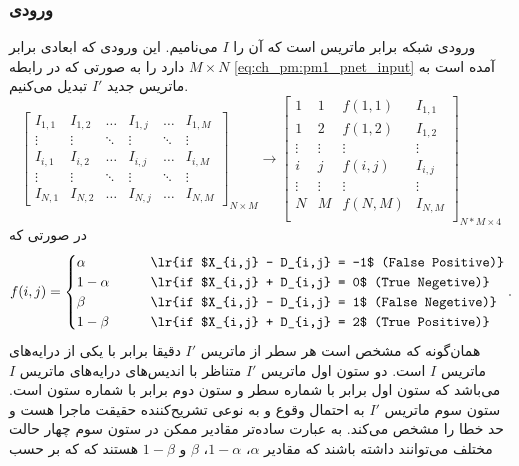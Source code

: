 \subsubsection{ورودی}
ورودی شبکه برابر ماتریس  است که آن را $I$ می‌نامیم. این ورودی که ابعادی برابر $M\times N$ دارد را به صورتی که در رابطه \ref{eq:ch_pm:pm1_pnet_input} آمده است به ماتریس جدید $I'$ تبدیل می‌کنیم. 
\begin{equation*}
	\begin{bmatrix}
		I_{1,1}  & I_{1,2} & \ldots   & I_{1,j}   & \ldots & I_{1,M}\\
		\vdots & \vdots & \ddots & \vdots & \ddots & \vdots \\
		I_{i,1}  & I_{i,2} & \ldots   & I_{i,j}   & \ldots & I_{i,M}\\
		\vdots & \vdots & \ddots & \vdots & \ddots & \vdots \\
		I_{N,1}  & I_{N,2} & \ldots   & I_{N,j}   & \ldots & I_{N,M}
	\end{bmatrix}_{N\times M}
	\rightarrow 
	 \begin{bmatrix}
	 	1          & 1         & f(1,1) & I_{1,1} \\
	 	1          & 2         & f(1,2) & I_{1,2} \\
	 	\vdots & \vdots & \vdots   & \vdots \\
	 	i          & j           & f(i,j)  & I_{i,j} \\
	 	\vdots & \vdots & \vdots   & \vdots \\
	 	N          & M         & f(N,M) & I_{N,M}\\
	 \end{bmatrix}_{N*M\times 4}
 	\label{eq:ch_pm:pm1_pnet_input}
\end{equation*}
در صورتی که
\begin{equation}
	f(i,j) = 
	\begin{cases}
		\alpha 	   \qquad & \text{\lr{if $X_{i,j} - D_{i,j} = -1$ (False Positive)}} \\
		1-\alpha  \qquad & \text{\lr{if $X_{i,j} + D_{i,j} = 0$ (True Negetive)}} \\
		\beta 		\qquad & \text{\lr{if $X_{i,j} - D_{i,j} =  1$ (False Negetive)}} \\
		1-\beta    \qquad & \text{\lr{if $X_{i,j} + D_{i,j} = 2$ (True Positive)}} 
	\end{cases}.
\end{equation}
همان‌گونه که مشخص است هر سطر از ماتریس $I'$ دقیقا برابر با یکی از درایه‌های ماتریس $I$ است. دو ستون اول ماتریس $I'$ متناظر با اندیس‌های درایه‌های ماتریس $I$ می‌باشد که ستون اول برابر با شماره سطر و ستون دوم برابر با شماره ستون است. ستون سوم ماتریس $I'$ به احتمال وقوع و به نوعی تشریح‌کننده حقیقت ماجرا هست و حد خطا را مشخص می‌کند. به عبارت ساده‌تر مقادیر ممکن در ستون سوم چهار حالت مختلف می‌توانند داشته باشند که مقادیر $\alpha$، $1-\alpha$، $\beta$ و $1-\beta$ هستند که که بر حسب
